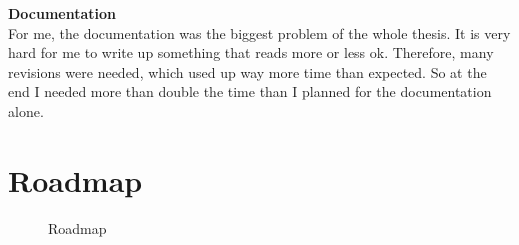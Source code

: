 \documentclass[
	a4paper               %
	,BCOR=0mm            %
	,bibliography=totoc   %
	,listof=totoc         %
	,monolingual
	,twoside=false
]{bfhthesis}              %
\begin{document}
\noindent
\textbf{Documentation}\\
For me, the documentation was the biggest problem of the whole thesis. It is very hard for me to write up something that reads more or less ok. Therefore, many revisions were needed, which used up way more time than expected. So at the end I needed more than double the time than I planned for the documentation alone.

\appendix

\chapter{Roadmap}
\begin{figure}[h]
	\centering
	\label{fig:roadmap}
	\caption{Roadmap}
\end{figure}




\end{document}
